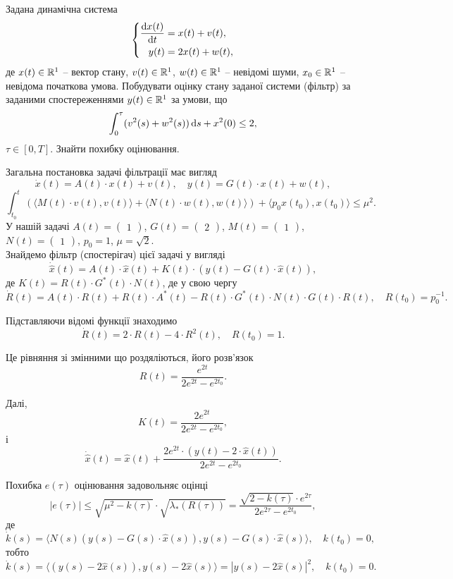\begin{problem}
	Задана динамічна система \[ \left\{ \begin{aligned}
		\frac{\mathop{}\!\mathrm{d} x(t)}{\mathop{}\!\mathrm{d} t} &= x(t) + v(t), \\
		y(t) &= 2 x(t) + w(t),
	\end{aligned} \right. \]
	де $x(t) \in \mathbb{R}^1$ -- вектор стану, $v(t) \in \mathbb{R}^1$, $w(t) \in \mathbb{R}^1$ -- невідомі шуми, $x_0 \in \mathbb{R}^1$ -- невідома початкова умова. Побудувати оцінку стану заданої системи (фільтр) за заданими спостереженнями $y(t) \in \mathbb{R}^1$ за умови, що \[ \int_0^\tau (v^2(s) + w^2(s)) \mathop{}\!\mathrm{d} s + x^2(0) \le 2, \] $\tau \in [0, T]$. Знайти похибку оцінювання.
\end{problem}

\begin{solution}
	Загальна постановка задачі фільтрації має вигляд \[ \dot x (t)= A (t) \cdot x (t)+ v (t), \quad y (t)= G (t) \cdot x(t) + w(t),\] \[\int_{t_0}^t ( \langle M(t) \cdot v(t), v(t)\rangle + \langle N(t) \cdot w(t), w(t)\rangle )  + \langle p_0 x(t_0), x(t_0) \rangle \le \mu^2. \] У нашій задачі $A (t)= \begin{pmatrix} 1 \end{pmatrix}$, $G (t)= \begin{pmatrix} 2 \end{pmatrix}$, $M (t)= \begin{pmatrix} 1 \end{pmatrix}$, $N (t)= \begin{pmatrix} 1 \end{pmatrix}$, $p_0 = 1$, $\mu = \sqrt{2}$. \\

	Знайдемо фільтр (спостерігач) цієї задачі у вигляді \[ \dot{\hat{x}} (t) = A (t) \cdot \hat x (t) + K (t) \cdot (y (t) - G (t) \cdot \hat x (t)), \] де $K (t)= R (t) \cdot G^* (t) \cdot N(t)$, де у свою чергу \[\dot R (t)= A (t) \cdot R (t)+ R (t) \cdot A^* (t)- R (t) \cdot G^* (t) \cdot N (t) \cdot G (t) \cdot R(t), \quad R(t_0) = p_0^{-1}. \]

 	Підставляючи відомі функції знаходимо \[\dot R (t)= 2 \cdot R (t) - 4 \cdot R^2(t), \quad R(t_0) = 1. \]

 	Це рівняння зі змінними що роздяліються, його розв'язок \[ R(t) = \frac{e^{2t}}{2e^{2t}-e^{2t_0}}. \]

 	Далі, \[ K(t) = \frac{2 e^{2t}}{2e^{2t}-e^{2t_0}}, \] і \[ \dot{\hat{x}} (t) = \hat x (t) + \frac{2 e^{2t} \cdot (y (t) - 2 \cdot \hat x (t))}{2e^{2t}-e^{2t_0}}. \]

 	Похибка $e(\tau)$ оцінювання задовольняє оцінці \[ |e(\tau)| \le \sqrt{\mu^2-k(\tau)} \cdot \sqrt{\lambda_* (R(\tau))} = \frac{ \sqrt{2 - k(\tau)} \cdot e^{2\tau}}{2e^{2\tau}-e^{2t_0}},\] де \[ \dot k (s) = \langle N(s) (y(s) - G(s) \cdot \hat x(s)), y(s) - G(s) \cdot \hat x(s)\rangle, \quad k(t_0) = 0, \] тобто \[ \dot k (s) = \langle (y(s) - 2 \hat x(s)), y(s) - 2 \hat x(s)\rangle = |y(s) - 2 \hat x(s)|^2, \quad k(t_0) = 0. \]
\end{solution}

